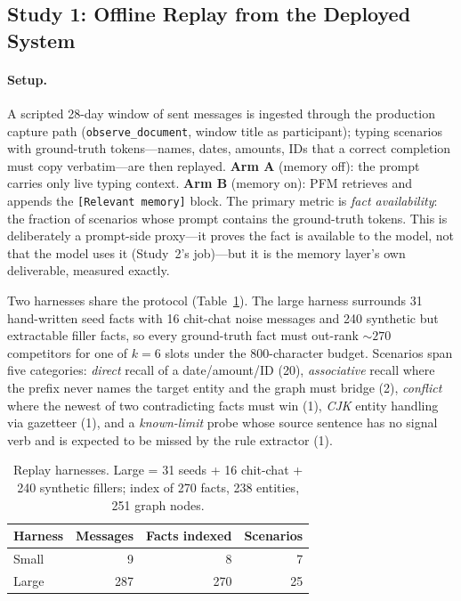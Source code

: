 \documentclass[letterpaper]{article}
\begin{document}
\subsection{Study 1: Offline Replay from the Deployed System}

\paragraph{Setup.}
A scripted 28-day window of sent messages is ingested through the
production capture path (\texttt{observe\_document}, window title as
participant); typing scenarios with ground-truth tokens---names, dates,
amounts, IDs that a correct completion must copy verbatim---are then
replayed. \textbf{Arm A} (memory off): the prompt carries only live
typing context. \textbf{Arm B} (memory on): PFM retrieves and appends the
\texttt{[Relevant memory]} block. The primary metric is \emph{fact
availability}: the fraction of scenarios whose prompt contains the
ground-truth tokens. This is deliberately a prompt-side proxy---it proves
the fact is available to the model, not that the model uses it (Study~2's
job)---but it is the memory layer's own deliverable, measured exactly.

Two harnesses share the protocol (Table~\ref{tab:harness}). The large
harness surrounds 31 hand-written seed facts with 16 chit-chat noise
messages and 240 synthetic but extractable filler facts, so every
ground-truth fact must out-rank ${\sim}270$ competitors for one of
$k{=}6$ slots under the 800-character budget. Scenarios span five
categories: \emph{direct} recall of a date/amount/ID (20), \emph{associative}
recall where the prefix never names the target entity and the graph must
bridge (2), \emph{conflict} where the newest of two contradicting facts
must win (1), \emph{CJK} entity handling via gazetteer (1), and a
\emph{known-limit} probe whose source sentence has no signal verb and is
expected to be missed by the rule extractor (1).

\begin{table}[t]
\centering
\small
\begin{tabular}{@{}lrrr@{}}
\toprule
Harness & Messages & Facts indexed & Scenarios \\
\midrule
Small & 9   & 8   & 7  \\
Large & 287 & 270 & 25 \\
\bottomrule
\end{tabular}
\caption{Replay harnesses. Large = 31 seeds + 16 chit-chat + 240
synthetic fillers; index of 270 facts, 238 entities, 251 graph nodes.}
\label{tab:harness}
\end{table}
\end{document}
